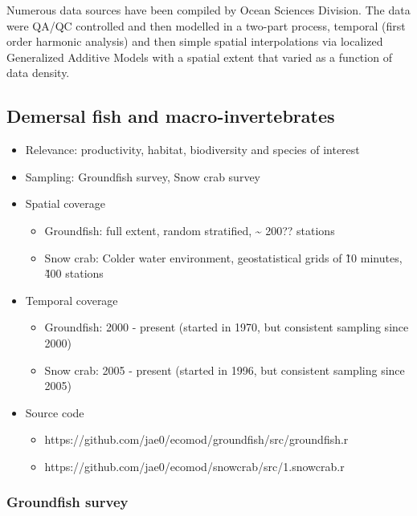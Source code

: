\documentclass[letterpaper,portrait,11pt]{scrartcl}
\numberwithin{equation}{section}		%
\numberwithin{figure}{section}			%
\numberwithin{table}{section}				%
\begin{document}
Numerous data sources have been compiled by Ocean Sciences Division. The data were QA/QC controlled and then modelled in a two-part process, temporal (first order harmonic analysis) and then simple spatial interpolations via localized Generalized Additive Models with a spatial extent that varied as a function of data density. 

\clearpage

\subsection{Demersal fish and macro-invertebrates}
\begin{itemize}
  \item Relevance:  productivity, habitat, biodiversity and species of interest
  \item Sampling:  Groundfish survey, Snow crab survey 
  \item Spatial coverage
    \begin{itemize}
      \item Groundfish: full extent, random stratified, \~{} 200?? stations
      \item Snow crab: Colder water environment, geostatistical grids of \~10 minutes, \~400 stations
    \end{itemize}
  \item Temporal coverage
    \begin{itemize}
      \item Groundfish: 2000 - present (started in 1970, but consistent sampling since 2000)
      \item Snow crab: 2005 - present (started in 1996, but consistent sampling since 2005)
    \end{itemize}

  \item Source code
      \begin{itemize}
        \item https://github.com/jae0/ecomod/groundfish/src/groundfish.r
        \item https://github.com/jae0/ecomod/snowcrab/src/1.snowcrab.r
      \end{itemize}
  
\end{itemize}


\subsubsection{Groundfish survey}
\end{document}
